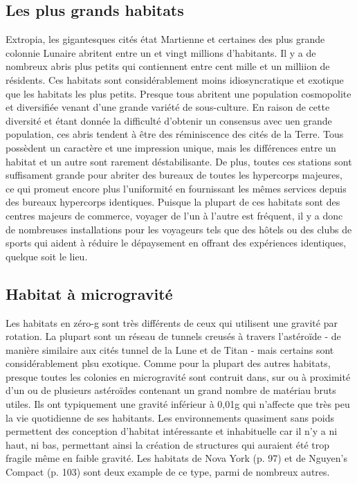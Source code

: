 \subsection{Les plus grands habitats} \label{sec:largest-habitats} 

Extropia, les gigantesques cités état Martienne et certaines des plus grande colonnie Lunaire abritent entre un et vingt millions d'habitants. Il y a de nombreux abris plus petits qui contiennent entre cent mille et un milliion de résidents. Ces habitats sont considérablement moins idiosyncratique et exotique que les habitats les plus petits. Presque tous abritent une population cosmopolite et diversifiée venant d'une grande variété de sous-culture. En raison de cette diversité et étant donnée la difficulté d'obtenir un consensus avec uen grande population, ces abris tendent à être des réminiscence des cités de la Terre. Tous possèdent un caractère et une impression unique, mais les différences entre un habitat et un autre sont rarement déstabilisante. De plus, toutes ces stations sont suffisament grande pour abriter des bureaux de toutes les hypercorps majeures, ce qui promeut encore plus l'uniformité en fournissant les mêmes services depuis des bureaux hypercorps identiques. Puisque la plupart de ces habitats sont des centres majeurs de commerce, voyager de l'un à l'autre est fréquent, il y a donc de nombreuses installations pour les voyageurs tels que des hôtels ou des clubs de sports qui aident à réduire le dépaysement en offrant des expériences identiques, quelque soit le lieu. 

\subsection{Habitat à microgravité} \label{sec:micr-habit} 

Les habitats en zéro-g sont très différents de ceux qui utilisent une gravité par rotation. La plupart sont un réseau de tunnels creusés à travers l'astéroïde - de manière similaire aux cités tunnel de la Lune et de Titan - mais certains sont  considérablement plsu exotique. Comme pour la plupart des autres habitats, presque toutes les colonies en microgravité sont contruit dans, sur ou à proximité d'un ou de plusieurs astéroïdes contenant un grand nombre de matériau bruts utiles. Ils ont typiquement une gravité inférieur à 0,01g qui n'affecte que très peu la vie quotidienne de ses habitants. Les environnements quasiment sans poids permettent des conception d'habitat intéressante et inhabituelle car il n'y a ni haut, ni bas, permettant ainsi la création de structures qui auraient été trop fragile même en faible gravité. Les habitats de Nova York (p. 97) et de Nguyen's Compact (p. 103) sont deux example de ce type, parmi de nombreux autres. 

